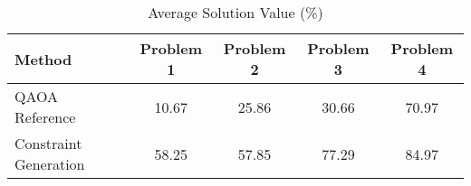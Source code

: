 \begin{table}[h]
\centering
\caption{Average Solution Value (\%)}
\begin{tabular}{lcccc}
\hline
Method & Problem 1 & Problem 2 & Problem 3 & Problem 4 \\
\hline
QAOA Reference & 10.67 & 25.86 & 30.66 & 70.97 \\
Constraint Generation & 58.25 & 57.85 & 77.29 & 84.97 \\
\hline
\end{tabular}
\end{table}